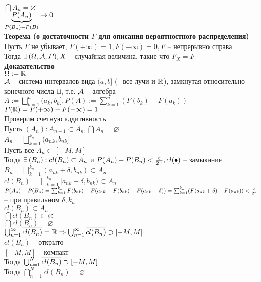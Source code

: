 \documentclass[12pt]{article}
\begin{document}
$\bigcap A_n = \varnothing$\\
$\ub{P(B_n) - P(B)}{P(A_n)} \rto 0$\\
\textbf{Теорема (о достаточности $F$ для описания вероятностного распределения)}\\
Пусть $F$ не убывает, $F(+\infty) = 1, F(-\infty) = 0, F$ -- непрерывно справа\\
Тогда $\ex (\Omega, \mcA, P), X$ -- случайная величина, такие что $F_X = F$\\
\textbf{Доказательство}\\
$\Omega := \Rset$\\
$\mcA$ -- система интервалов вида $(a,b]$ (+все лучи и $\Rset$), замкнутая относительно конечного числа $\sqcup$, т.е. $\mcA$ -- алгебра\\
$A := \bigsqcup_{k=1}^n (a_k, b_k], P(A) := \sum_{k=1}^n (F(b_k) - F(a_k))$\\
$P(\Rset) = F(+\infty) - F(-\infty) = 1$\\
Проверим счетную аддитивность\\
Пусть $(A_n): A_{n+1} \subset A_n, \bigcap A_n = \varnothing$\\
$A_n = \bigsqcup_{k=1}^{k_n} (a_{nk}, b_{nk}]$\\
Пусть все $A_n \subset [-M, M]$\\
Тогда $\ex (B_n): cl(B_n) \subset A_n$ и $P(A_n) - P(B_n) < \frac{\eps}{2^n}, cl(\bullet)$ -- замыкание\\
$B_n = \bigsqcup_{k=1}^{k_n} (a_{nk}+\delta, b_{nk}) \subset A_n$\\
$cl(B_n) = \bigsqcup_{k=1}^{k_n} [a_{nk}+\delta, b_{nk}) \subset A_n$\\
$P(A_n) - P(B_n) = \sum_{k=1}^{k_n} F(b_{nk})-F(a_{nk} - F(b_{nk}) + F(a_{nk}+\delta)) = \sum_{k=1}^{k_n} (F(a_{nk}+\delta) - F(a_{nk})) < \frac{\eps}{2^n}$ -- при правильном $\delta, k_n$\\
$cl(B_n) \subset A_n$\\
$\bigcap cl(B_n) \subset \varnothing$\\
$\bigcap cl(B_n) = \varnothing$\\
$\bigcup_{n=1}^\infty \ol{cl(B_n)} = \Rset \Rto \bigcup_{n=1}^\infty \ol{cl (B_n)} \supset [-M, M]$\\
$cl(B_n)$ -- открыто\\
$[-M, M]$ -- компакт\\
Тогда $\bigcup_{n=1}^N \ol{cl(B_n)} \supset [-M, M]$\\
Тогда $\bigcap_{n=1}^N cl(B_n) = \varnothing$\\
\end{document}
